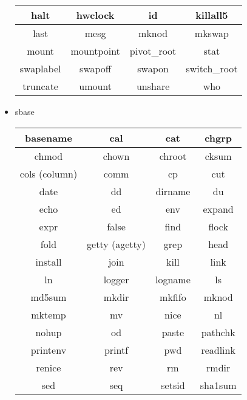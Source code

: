 \begin{itemize}
\begin{center}
\begin{tabular}{|c|c|c|c|}
                \hline
                halt & hwclock & id & killall5 \\
                \hline
                last & mesg & mknod & mkswap \\
                \hline
                mount & mountpoint & pivot\_root & stat \\
                \hline
                swaplabel & swapoff & swapon & switch\_root \\
                \hline
                truncate & umount & unshare & who \\
                \hline
            \end{tabular}
        \end{center}
    \item sbase
        \begin{center}
            \begin{tabular}{|c|c|c|c|}
                \hline
                basename & cal & cat & chgrp \\
                \hline
                chmod & chown & chroot & cksum \\
                \hline
                cols (column) & comm & cp & cut \\
                \hline
                date & dd & dirname & du \\
                \hline
                echo & ed & env & expand \\
                \hline
                expr & false & find & flock \\
                \hline
                fold & getty (agetty) & grep & head \\
                \hline
                install & join & kill & link \\
                \hline
                ln & logger & logname & ls \\
                \hline
                md5sum & mkdir & mkfifo & mknod \\
                \hline
                mktemp & mv & nice & nl \\
                \hline
                nohup & od & paste & pathchk \\
                \hline
                printenv & printf & pwd & readlink \\
                \hline
                renice & rev & rm & rmdir \\
                \hline
                sed & seq & setsid & sha1sum \\

\end{tabular}
\end{center}
\end{itemize}
